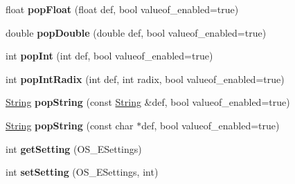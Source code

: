 \begin{DoxyCompactItemize}
\item 
float {\bfseries pop\+Float} (float def, bool valueof\+\_\+enabled=true)\hypertarget{class_object_script_1_1_o_s_a8604eafea66a8623ff5f959cdf2eb969}{}\label{class_object_script_1_1_o_s_a8604eafea66a8623ff5f959cdf2eb969}

\item 
double {\bfseries pop\+Double} (double def, bool valueof\+\_\+enabled=true)\hypertarget{class_object_script_1_1_o_s_ab59d2e726724b744307a28262cffa7c3}{}\label{class_object_script_1_1_o_s_ab59d2e726724b744307a28262cffa7c3}

\item 
int {\bfseries pop\+Int} (int def, bool valueof\+\_\+enabled=true)\hypertarget{class_object_script_1_1_o_s_aafd49afa622047334ae281f941a18f30}{}\label{class_object_script_1_1_o_s_aafd49afa622047334ae281f941a18f30}

\item 
int {\bfseries pop\+Int\+Radix} (int def, int radix, bool valueof\+\_\+enabled=true)\hypertarget{class_object_script_1_1_o_s_ab57fccf26d1e7ee48c84483c55227d92}{}\label{class_object_script_1_1_o_s_ab57fccf26d1e7ee48c84483c55227d92}

\item 
\hyperlink{class_object_script_1_1_o_s_1_1_string}{String} {\bfseries pop\+String} (const \hyperlink{class_object_script_1_1_o_s_1_1_string}{String} \&def, bool valueof\+\_\+enabled=true)\hypertarget{class_object_script_1_1_o_s_a2547fe40726fed5d0b491e1c012c23c9}{}\label{class_object_script_1_1_o_s_a2547fe40726fed5d0b491e1c012c23c9}

\item 
\hyperlink{class_object_script_1_1_o_s_1_1_string}{String} {\bfseries pop\+String} (const char $\ast$def, bool valueof\+\_\+enabled=true)\hypertarget{class_object_script_1_1_o_s_acbeb7b7ea383f57ce2117f95936a4a6d}{}\label{class_object_script_1_1_o_s_acbeb7b7ea383f57ce2117f95936a4a6d}

\item 
int {\bfseries get\+Setting} (O\+S\+\_\+\+E\+Settings)\hypertarget{class_object_script_1_1_o_s_adc5ac6f905bfae8effc49ba6bebc9c76}{}\label{class_object_script_1_1_o_s_adc5ac6f905bfae8effc49ba6bebc9c76}

\item 
int {\bfseries set\+Setting} (O\+S\+\_\+\+E\+Settings, int)\hypertarget{class_object_script_1_1_o_s_a3d6fafecc6fee90b59c3dc0e69aae436}{}\label{class_object_script_1_1_o_s_a3d6fafecc6fee90b59c3dc0e69aae436}


\end{DoxyCompactItemize}
